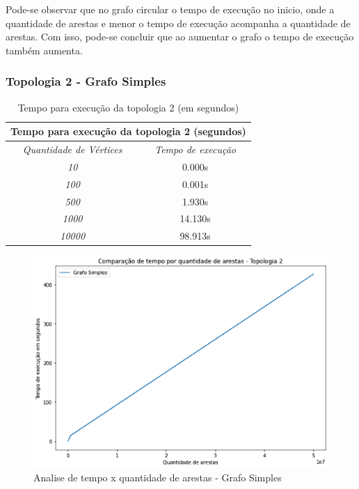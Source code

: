 Pode-se observar que no grafo circular o tempo de execução no inicio, onde a quantidade de arestas e menor o tempo de execução acompanha a quantidade de arestas. Com isso, pode-se concluir que ao aumentar o grafo o tempo de execução também aumenta.

\pagebreak

\subsubsection{Topologia 2 - Grafo Simples}

\begin{center}
\begin{table}[ht]
    \centering
    \begin{tabular}{|c | c |}
     \hline
        \multicolumn{2}{|c|}{\textbf{Tempo para execução da topologia 2 (segundos)}} \\
     \hline
         \emph{Quantidade de Vértices} & \emph{Tempo de execução}\\ [0.5ex] 
     \hline
         \emph{10} & 0.000s \\ 
     \hline
         \emph{100} & 0.001s \\
     \hline
         \emph{500} & 1.930s \\
     \hline
         \emph{1000} & 14.130s \\
     \hline
         \emph{10000} & 98.913s \\
     \hline
    \end{tabular}
    \caption{Tempo para execução da topologia 2 (em segundos)}
    \label{tab:tabela_topologia_2}
\end{table}
    
\end{center}

\begin{figure}[H]
    \centering
    \includegraphics[width=.6\textwidth]{figuras/simples.png}
    \caption{Analise de tempo x quantidade de arestas - Grafo Simples}
    \label{fig:figure30}
\end{figure}

